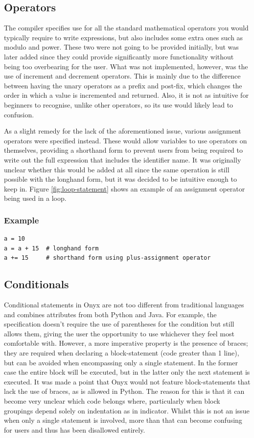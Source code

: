 \documentclass[
]{report}
\begin{document}
\subsection{Operators}
The compiler specifies use for all the standard mathematical operators
you would typically require to write \glspl{expression}, but also includes some
extra ones such as modulo and power. These two were not going to be
provided initially, but was later added since they could provide
significantly more functionality without being too overbearing for the
user. What was not implemented, however, was the use of increment and
decrement operators. This is mainly due to the difference between
having the unary operators as a prefix and post-fix, which changes the
order in which a value is incremented and returned. Also, it is not as
intuitive for beginners to recognise, unlike other operators, so its use
would likely lead to confusion.

As a slight remedy for the lack of the aforementioned issue, various
assignment operators were specified instead. These would allow variables
to use operators on themselves, providing a shorthand form to prevent
users from being required to write out the full \gls{expression} that includes the
\gls{identifier} name. It was originally unclear whether this would be added
at all since the same operation is still possible with the longhand
form, but it was decided to be intuitive enough to keep in. Figure \ref{fig:loop-statement}
shows an example of an assignment operator being used in a loop.

\subsubsection{Example}
\begin{verbatim}
a = 10
a = a + 15  # longhand form
a += 15     # shorthand form using plus-assignment operator
\end{verbatim}

\subsection{Conditionals}
Conditional \glspl{statement} in Onyx are not too different from traditional
languages and combines attributes from both Python and Java. For
example, the specification doesn't require the use of parentheses for
the condition but still allows them, giving the user the opportunity to
use whichever they feel most comfortable with. However, a more
imperative property is the presence of braces; they are required when
declaring a \gls{block-statement} (code greater than 1 line), but can be
avoided when encompassing only a single \gls{statement}. In the former case
the entire block will be executed, but in the latter only the next
\gls{statement} is executed. It was made a point that Onyx would not feature
\glspl{block-statement} that lack the use of braces, as is allowed in Python.
The reason for this is that it can become very unclear which code
belongs where, particularly when block groupings depend solely on
indentation as in indicator. Whilst this is not an issue when only a
single \gls{statement} is involved, more than that can become confusing for
users and thus has been disallowed entirely.
\end{document}
